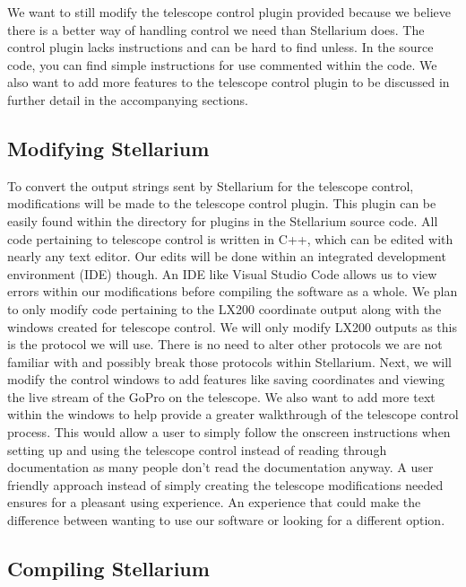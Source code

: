 \documentclass[12pt]{report}
\begin{document}
We want to still modify the telescope control plugin provided because we believe there is a better way of handling control we need than Stellarium does. The control plugin lacks instructions and can be hard to find unless. In the source code, you can find simple instructions for use commented within the code. We also want to add more features to the telescope control plugin to be discussed in further detail in the accompanying sections.

\subsection*{Modifying Stellarium}

To convert the output strings sent by Stellarium for the telescope control, modifications will be made to the telescope control plugin. This plugin can be easily found within the directory for plugins in the Stellarium source code. All code pertaining to telescope control is written in C++, which can be edited with nearly any text editor. Our edits will be done within an integrated development environment (IDE) though. An IDE like Visual Studio Code allows us to view errors within our modifications before compiling the software as a whole. We plan to only modify code pertaining to the LX200 coordinate output along with the windows created for telescope control. We will only modify LX200 outputs as this is the protocol we will use. There is no need to alter other protocols we are not familiar with and possibly break those protocols within Stellarium. Next, we will modify the control windows to add features like saving coordinates and viewing the live stream of the GoPro on the telescope. We also want to add more text within the windows to help provide a greater walkthrough of the telescope control process. This would allow a user to simply follow the onscreen instructions when setting up and using the telescope control instead of reading through documentation as many people don’t read the documentation anyway. A user friendly approach instead of simply creating the telescope modifications needed ensures for a pleasant using experience. An experience that could make the difference between wanting to use our software or looking for a different option.

\subsection*{Compiling Stellarium}
\end{document}

